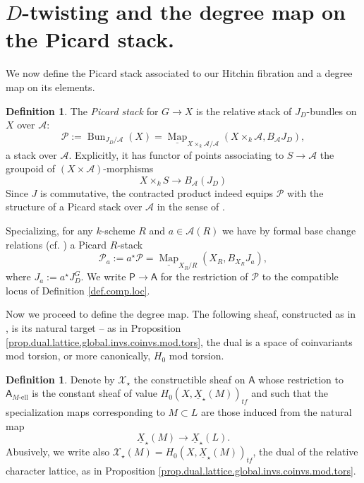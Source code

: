 \documentclass[openany]{amsbook}
\theoremstyle{definition}
\newtheorem{definition}[theorem]{Definition}
\theoremstyle{remark}
\numberwithin{equation}{section}
\newcommand{\cA}{\mathcal{A}}
\newcommand{\cX}{\mathcal{X}}
\newcommand{\cP}{\mathcal{P}}
\newcommand{\ul}[1]{\underline{#1}}
\renewcommand{\-}{\operatorname{-}}
\newcommand{\Map}{\ul{\operatorname{Map}}}
\newcommand{\on}[1]{\operatorname{#1}}
\newcommand{\el}{\text{-ell}}
\newcommand{\bA}{\mathsf{A}}
\newcommand{\bAe}[1]{\bA_{#1\el}}
\newcommand{\bP}{\mathsf{P}}
\newcommand{\tf}{\mathit{tf}}
\begin{document}
\section{\texorpdfstring{$D$-twisting and the degree map on the Picard stack.}{D-twisting and the degree map on the Picard stack.}}\label{subsect.Pic.deg}

We now define the Picard stack associated to our Hitchin fibration and a degree map on its elements. 

\begin{definition}
    The \emph{Picard stack} for $G \to X$ is the relative stack of $J_D$-bundles on $X$ over $\cA$:
    $$\cP := \on{Bun}_{J_D/\cA}(X) = \Map_{X \times_k \cA/\cA}(X \times_k \cA, B_{\cA} J_D),$$
    a stack over $\cA$. Explicitly, it has functor of points associating to $S \to \cA$ the groupoid of $(X \times \cA)$-morphisms
    $$
        X \times_k S \to B_{\cA}(J_D) 
    $$
    Since $J$ is commutative, the contracted product indeed equips $\cP$ with the structure of a Picard stack over $\cA$ in the sense of \cite[Exp.\ XVIII, Def. 1.4.2]{SGAIV}.
    
    Specializing, for any $k$-scheme $R$ and $a \in \cA(R)$ we have by formal base change relations (cf. \cite[Lemma 1.1.1]{HalpernLeistnerInstability}) a Picard $R$-stack
    $$
        \cP_a := a^\star \cP = \Map_{X_R/R}(X_R, B_{X_R} J_a),
    $$
    where $J_a := a^\star J_D^G$. We write $\bP \to \bA$ for the restriction of $\cP$ to the compatible locus of Definition \ref{def.comp.loc}. 
\end{definition}



Now we proceed to define the degree map. The following sheaf, constructed as in \cite[\S 6]{CLII}, is its natural target -- as in Proposition \ref{prop.dual.lattice.global.invs.coinvs.mod.tors}, the dual is a space of coinvariants mod torsion, or more canonically, $H_0$ mod torsion.

\begin{definition}\label{def.cochar.sheaf}
Denote by $\cX_\star$ the constructible sheaf on $\bA$ whose restriction to $\bAe{M}$ is the constant sheaf of value $H_0(X, \ul{X}_\star(M))_{\tf}$ and such that the specialization maps corresponding to $M \subset L$ are those induced from the natural map $$\ul{X}_\star(M) \to \ul{X}_\star(L).$$ Abusively, we write also $\cX_\star(M) = H_0(X, \ul{X}_\star(M))_{\tf}$, the dual of the relative character lattice, as in Proposition \ref{prop.dual.lattice.global.invs.coinvs.mod.tors}.
\end{definition}
\end{document}
